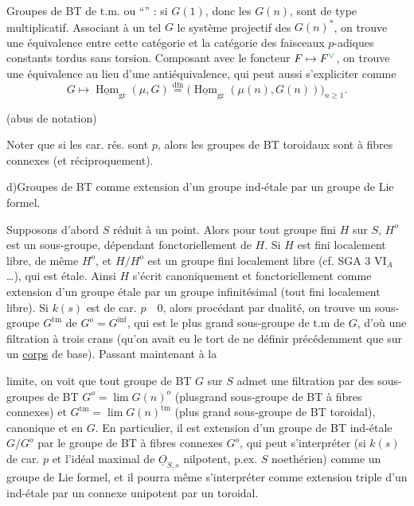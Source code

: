 Groupes de BT de t.m. ou ``'' : si $G(1)$, donc les $G(n)$, sont de type multiplicatif. Associant à un tel $G$ le système projectif des $G(n)^*$, on trouve  une équivalence entre cette catégorie et la catégorie des faisceaux $p$-adiques constants tordus sans torsion. Composant avec le foncteur $F\mapsto F^{\inserted{\vee}}$, on trouve une équivalence au lieu d'une antiéquivalence, qui peut aussi s'expliciter comme 
\[
G\longmapsto\underline{\operatorname{Hom}}_{\mathrm{gr}}(\mu,G)
\overset{\mathrm{dfn}}{=}
\bigl(\underline{\operatorname{Hom}}_{\mathrm{gr}}(\mu(n),G(n))\bigr)_{n\geq1}.
\]
\begin{center}(abus de notation)\end{center}
Noter que si les car. rés. sont $p$, alors les groupes de BT toroidaux sont  à fibres connexes (et réciproquement).

d)\quad Groupes de BT comme extension d'un groupe ind-étale par un groupe de Lie formel.

Supposons d'abord $S$  réduit à un point. Alors pour tout groupe fini $H$ sur $S$, $H^o$ est un sous-groupe, dépendant fonctoriellement de $H$. Si $H$ est fini localement libre, de même $H^o$, et $H/H^o$ est  un groupe fini localement libre (cf. SGA 3 $\mathrm{VI}_A$ \ldots), qui est étale. Ainsi $H$ s'écrit canoniquement et fonctoriellement comme extension d'un groupe étale par un groupe infinitésimal (tout fini localement libre). Si $k(s)$ est de car. $p\quad0$, alors procédant par dualité, on trouve un sous-groupe $G^{\mathrm{tm}}$ de $G^o=G^{\mathrm{inf}}$, qui est le plus grand sous-groupe de t.m de $G$, d'où une filtration à trois crans (qu'on avait eu le tort de ne définir précédemment que sur un \uline{corps}  de base). Passant maintenant à la

limite, on voit que tout groupe de BT $G$ sur $S$  admet une filtration par des sous-groupes de BT $G^o=\lim G(n)^o$ (plusgrand sous-groupe de BT à fibres connexes) et $G^{\mathrm{tm}}=\lim G(n)^{\mathrm{tm}}$ (plus grand sous-groupe de BT  toroidal), canonique et  en $G$. En particulier, il est extension d'un groupe de BT ind-étale $G/G^o$ par le groupe de BT à fibres connexes $G^o$, qui peut s'interpréter (si $k(s)$ de car. $p$  et l'idéal maximal de $\underline{O}_{S,s}$ nilpotent, p.ex. $S$ noethérien) comme un groupe de Lie formel, et il pourra même s'interpréter comme extension triple d'un ind-étale par un connexe unipotent par un toroidal.

